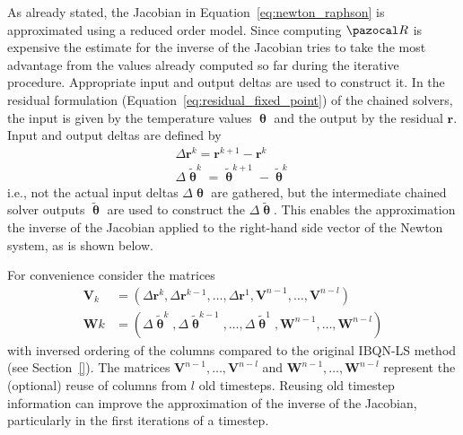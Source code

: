 As already stated, the Jacobian in Equation~\eqref{eq:newton_raphson} is approximated using a reduced order model.
Since computing \(\pazocal R\) is expensive the estimate for the inverse of the Jacobian tries to take the most advantage from the values already computed so far during the iterative procedure.
Appropriate input and output deltas are used to construct it.
In the residual formulation (Equation~\eqref{eq:residual_fixed_point}) of the chained solvers, the input is given by the temperature values $\bm \uptheta$ and the output by the residual $\mathbf{r}$.
Input and output deltas are defined by
\begin{gather}
\Delta \mathbf{r}^{k}=\mathbf{r}^{k+1}-\mathbf{r}^{k} \\
\Delta \tilde{\bm{\uptheta}}^{k}=\tilde{\bm{\uptheta}}^{k+1}-\tilde{\bm{\uptheta}}^{k}
\end{gather}
i.e., not the actual input deltas $\Delta \bm{\uptheta}$ are gathered, but the intermediate chained solver outputs $\tilde{\bm{\uptheta}}$ are used to construct the $\Delta \tilde{\bm{\uptheta}}$.
This enables the approximation the inverse of the Jacobian applied to the right-hand side vector of the Newton system, as is shown below.

For convenience consider the matrices
\begin{align}
\mathbf{V}_{k} &=\left(\Delta \mathbf{r}^{k}, \Delta \mathbf{r}^{k-1}, \ldots, \Delta \mathbf{r}^{1}, \mathbf{V}^{n-1}, \ldots, \mathbf{V}^{n-l}\right)\label{eq:matrix_delta_res} \\
\mathbf{W}{k} &=\left(\Delta \tilde{\bm{\uptheta}}^{k}, \Delta \tilde{\bm{\uptheta}}^{k-1}, \ldots, \Delta \tilde{\bm{\uptheta}}^{1}, \mathbf{W}^{n-1}, \ldots, \mathbf{W}^{n-l}\right) \label{eq:matrix_delta_theta}
\end{align}
with inversed ordering of the columns compared to the original IBQN-LS method (see Section~\ref{}).
The matrices \(\mathbf{V}^{n-1}, \ldots, \mathbf{V}^{n-l}\) and \(\mathbf{W}^{n-1}, \ldots, \mathbf{W}^{n-l}\) represent the (optional) reuse of columns from \(l\) old timesteps.
Reusing old timestep information can improve the approximation of the inverse of the Jacobian, particularly in the first iterations of a timestep.


